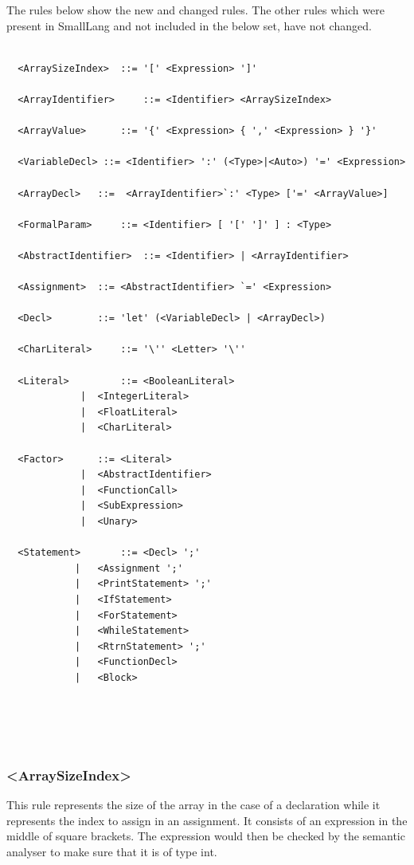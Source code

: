 \documentclass{article}
\begin{document}
				The rules below show the new and changed rules. The other rules which were present in SmallLang and not included in the below set, have not changed.
				
				\begin{lstlisting}[backgroundcolor=\color{lightgray},basicstyle=\small,upquote=true]
				
  <ArraySizeIndex> 	::= '[' <Expression> ']'
  
  <ArrayIdentifier> 	::= <Identifier> <ArraySizeIndex>
  
  <ArrayValue> 		::= '{' <Expression> { ',' <Expression> } '}'
  
  <VariableDecl> ::= <Identifier> ':' (<Type>|<Auto>) '=' <Expression> 
  
  <ArrayDecl> 	::=  <ArrayIdentifier>`:' <Type> ['=' <ArrayValue>] 
  
  <FormalParam> 	::= <Identifier> [ '[' ']' ] : <Type>
  
  <AbstractIdentifier>	::= <Identifier> | <ArrayIdentifier>
  
  <Assignment>	::= <AbstractIdentifier> `=' <Expression>
  
  <Decl> 		::= 'let' (<VariableDecl> | <ArrayDecl>)
  
  <CharLiteral>  	::= '\'' <Letter> '\''
  
  <Literal> 		::= <BooleanLiteral>
  			 |  <IntegerLiteral>
  			 |  <FloatLiteral>
  			 |  <CharLiteral>
  					
  <Factor> 		::= <Literal>
  			 |  <AbstractIdentifier>
  			 |  <FunctionCall>
  			 |  <SubExpression>
  			 |  <Unary>
  
  <Statement> 		::= <Decl> ';'
  			|   <Assignment ';'
  			|   <PrintStatement> ';'
  			|   <IfStatement> 
  			|   <ForStatement> 
  			|   <WhileStatement> 
  			|   <RtrnStatement> ';'
  			|   <FunctionDecl>
  			|   <Block>
  
  
  	
				  
				\end{lstlisting}
				
				
				\subsubsection{\textless ArraySizeIndex\textgreater}
				
				This rule represents the size of the array in the case of a declaration while it represents the index to assign in an assignment. It consists of an expression in the middle of square brackets. The expression would then be checked by the semantic analyser to make sure that it is of type int.
				
\end{document}
